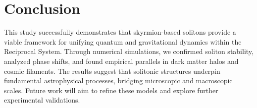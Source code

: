 \documentclass{article}
\begin{document}
\section{Conclusion}
This study successfully demonstrates that skyrmion-based solitons provide a viable framework for unifying quantum and gravitational dynamics within the Reciprocal System. Through numerical simulations, we confirmed soliton stability, analyzed phase shifts, and found empirical parallels in dark matter halos and cosmic filaments. The results suggest that solitonic structures underpin fundamental astrophysical processes, bridging microscopic and macroscopic scales. Future work will aim to refine these models and explore further experimental validations.
\end{document}
